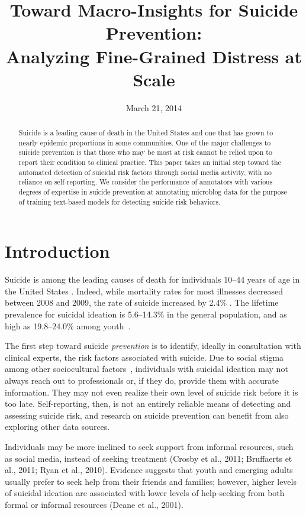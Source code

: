\documentclass[11pt]{article}
\title{Toward Macro-Insights  for Suicide Prevention: \\ Analyzing Fine-Grained Distress at Scale}
\date{March 21, 2014}
\begin{document}
\maketitle
\begin{abstract}
Suicide is a leading cause of death in the United States and one that has grown to nearly epidemic proportions in some communities. One of the major challenges to suicide prevention is that those who may be most at risk cannot be relied upon to report their condition to clinical practice. This paper takes an initial step toward the automated detection of suicidal risk factors through social media activity, with no reliance on self-reporting.  We consider the performance of annotators with various degrees of expertise in suicide prevention at annotating microblog data for the purpose of training text-based models for detecting suicide risk behaviors.
 \end{abstract}

\section{Introduction}


Suicide is among the leading causes of death for individuals 10--44 years of age in the United States \cite{heron2009deaths}. Indeed, while mortality rates for most illnesses decreased between 2008 and 2009, the rate of suicide increased by 2.4\%  \cite{heron2009deaths}. The lifetime prevalence for suicidal ideation is 5.6--14.3\% in the general population, and as high as 19.8--24.0\% among youth~\cite{nock2008suicide}. 

The first step toward suicide \emph{prevention} is to identify, ideally in consultation with clinical experts, the risk factors associated with suicide.  Due to social stigma among other sociocultural factors~\cite{crosby2011self}, individuals with suicidal ideation may not always reach out to professionals or, if they do, provide them with accurate information. They may not even realize their own level of suicide risk before it is too late. Self-reporting, then, is not an entirely reliable means of detecting and assessing suicide risk, and research on suicide prevention can benefit from also exploring other data sources.

 Individuals may be more inclined to seek support from informal resources, such as social media, instead of seeking treatment (Crosby et al., 2011; Bruffaerts et al., 2011; Ryan et al., 2010). Evidence suggests that youth and emerging adults usually prefer to seek help from their friends and families; however, higher levels of suicidal ideation are associated with lower levels of help-seeking from both formal or informal resources (Deane et al., 2001).  
\end{document}
